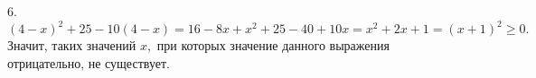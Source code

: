 6. $(4-x)^2+25-10(4-x)=16-8x+x^2+25-40+10x=x^2+2x+1=(x+1)^2\geqslant0.$ Значит, таких значений $x,$ при которых значение данного выражения отрицательно, не существует.\\
